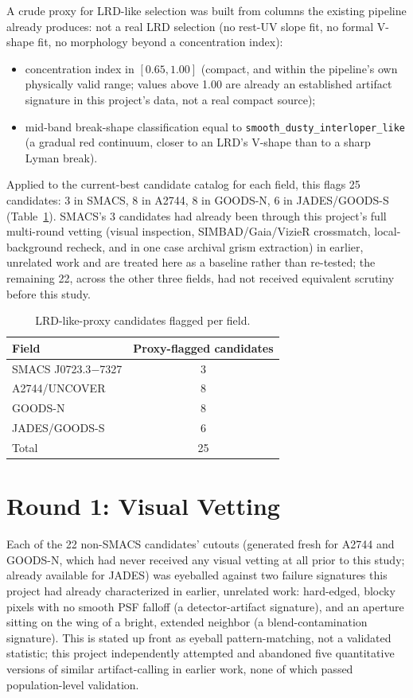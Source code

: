 \documentclass[11pt]{article}
\begin{document}
A crude proxy for LRD-like selection was built from columns the existing pipeline
already produces: not a real LRD selection (no rest-UV slope fit, no formal
V-shape fit, no morphology beyond a concentration index):
\begin{itemize}
    \item concentration index in $[0.65, 1.00]$ (compact, and within the
    pipeline's own physically valid range; values above 1.00 are already an
    established artifact signature in this project's data, not a real compact
    source);
    \item mid-band break-shape classification equal to
    \texttt{smooth\_dusty\_interloper\_like} (a gradual red continuum, closer to
    an LRD's V-shape than to a sharp Lyman break).
\end{itemize}

Applied to the current-best candidate catalog for each field, this flags 25
candidates: 3 in SMACS, 8 in A2744, 8 in GOODS-N, 6 in JADES/GOODS-S
(Table~\ref{tab:proxy_counts}). SMACS's 3 candidates had already been through
this project's full multi-round vetting (visual inspection, SIMBAD/Gaia/VizieR
crossmatch, local-background recheck, and in one case archival grism extraction)
in earlier, unrelated work and are treated here as a baseline rather than
re-tested; the remaining 22, across the other three fields, had not received
equivalent scrutiny before this study.

\begin{table}[H]
\centering
\caption{LRD-like-proxy candidates flagged per field.}
\label{tab:proxy_counts}
\begin{tabular}{lc}
\toprule
Field & Proxy-flagged candidates \\
\midrule
SMACS J0723.3$-$7327 & 3 \\
A2744/UNCOVER         & 8 \\
GOODS-N                & 8 \\
JADES/GOODS-S           & 6 \\
\midrule
Total                   & 25 \\
\bottomrule
\end{tabular}
\end{table}

\section{Round 1: Visual Vetting}

Each of the 22 non-SMACS candidates' cutouts (generated fresh for A2744 and
GOODS-N, which had never received any visual vetting at all prior to this study;
already available for JADES) was eyeballed against two failure signatures this
project had already characterized in earlier, unrelated work: hard-edged, blocky
pixels with no smooth PSF falloff (a detector-artifact signature), and an
aperture sitting on the wing of a bright, extended neighbor (a blend-contamination
signature). This is stated up front as eyeball pattern-matching, not a validated
statistic; this project independently attempted and abandoned five quantitative
versions of similar artifact-calling in earlier work, none of which passed
population-level validation.
\end{document}
